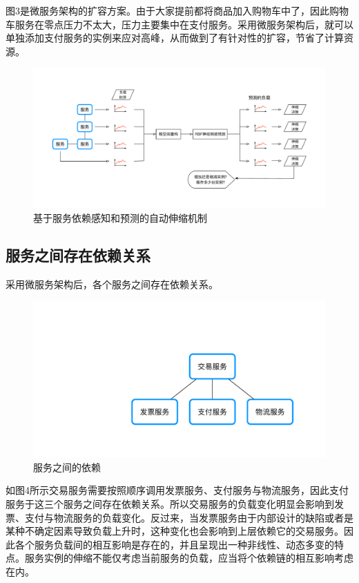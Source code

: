 \documentclass[10.5pt,twocolumn]{jbuaa}
\begin{document}
图3是微服务架构的扩容方案。由于大家提前都将商品加入购物车中了，因此购物车服务在零点压力不太大，压力主要集中在支付服务。采用微服务架构后，就可以单独添加支付服务的实例来应对高峰，从而做到了有针对性的扩容，节省了计算资源。

\begin{figure}[!t]
\centering
\includegraphics [scale=0.5,trim=0 0 0 0]{./image/7.pdf}
\caption{基于服务依赖感知和预测的自动伸缩机制}
\end{figure}

\subsection{服务之间存在依赖关系}
采用微服务架构后，各个服务之间存在依赖关系。
\begin{figure}[H]
\centering
\includegraphics [scale=0.4,trim=0 0 0 0]{./image/4.pdf}
\caption{服务之间的依赖}
\end{figure}
如图4所示交易服务需要按照顺序调用发票服务、支付服务与物流服务，因此支付服务于这三个服务之间存在依赖关系。所以交易服务的负载变化明显会影响到发票、支付与物流服务的负载变化。反过来，当发票服务由于内部设计的缺陷或者是某种不确定因素导致负载上升时，这种变化也会影响到上层依赖它的交易服务。因此各个服务负载间的相互影响是存在的，并且呈现出一种非线性、动态多变的特点。服务实例的伸缩不能仅考虑当前服务的负载，应当将个依赖链的相互影响考虑在内。
\end{document}
